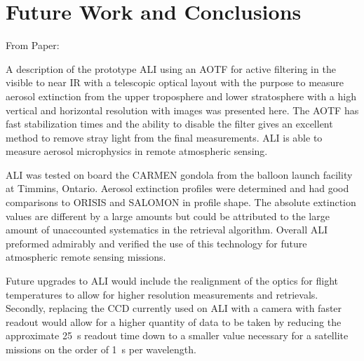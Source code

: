 \chapter{Future Work and Conclusions}

From Paper:

A description of the prototype ALI using an AOTF for active filtering in the visible to near IR with a telescopic optical layout with the purpose to measure aerosol extinction from the upper troposphere and lower stratosphere with a high vertical and horizontal resolution with images was presented here. The AOTF has fast stabilization times and the ability to disable the filter gives an excellent method to remove stray light from the final measurements. ALI is able to measure aerosol microphysics in remote atmospheric sensing.

ALI was tested on board the CARMEN gondola from the balloon launch facility at Timmins, Ontario. Aerosol extinction profiles were determined and had good comparisons to ORISIS and SALOMON in profile shape. The absolute extinction values are different by a large amounts but could be attributed to the large amount of unaccounted systematics in the retrieval algorithm. Overall ALI preformed admirably and verified the use of this technology for future atmospheric remote sensing missions.

Future upgrades to ALI would include the realignment of the optics for flight temperatures to allow for higher resolution measurements and retrievals. Secondly, replacing the CCD currently used on ALI with a camera with faster readout would allow for a higher quantity of data to be taken by reducing the approximate 25~s readout time down to a smaller value necessary for a satellite missions on the order of 1~s per wavelength. 